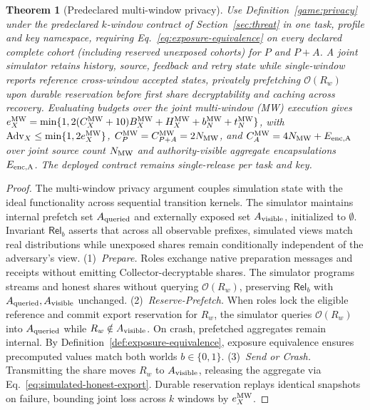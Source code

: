 \documentclass[conference,compsoc]{IEEEtran}
\theoremstyle{definition}
\numberwithin{equation}{section}
\numberwithin{table}{section}
\numberwithin{figure}{section}
\theoremstyle{plain}
\newtheorem{theorem}{Theorem}[section]
\newtheorem{theorem}{Theorem}
\begin{document}
\begin{theorem}[Predeclared multi-window privacy]
\label{thm:multi-window-privacy}
Use Definition~\ref{game:privacy} under the predeclared \(k\)-window contract of Section~\ref{sec:threat} in one task, profile and key namespace, requiring Eq.~\eqref{eq:exposure-equivalence} on every declared complete cohort (including reserved unexposed cohorts) for \(P\) and \(P{+}A\). A joint simulator retains history, source, feedback and retry state while single-window reports reference cross-window accepted states, privately prefetching \(\mathcal O(R_w)\) upon durable reservation before first share decryptability and caching across recovery. Evaluating budgets over the joint multi-window (MW) execution gives \(e_X^{\rm MW}=\min\{1,2(C_X^{\rm MW}+10)B_X^{\rm MW}+H_X^{\rm MW}+b_N^{\rm MW}+t_N^{\rm MW}\}\), with \(\operatorname{Adv}_X\le\min\{1,2e_X^{\rm MW}\}\), \(C_P^{\rm MW}=C_{P+A}^{\rm MW}=2N_{\rm MW}\), and \(C_A^{\rm MW}=4N_{\rm MW}+E_{\rm enc,A}\) over joint source count \(N_{\rm MW}\) and authority-visible aggregate encapsulations \(E_{\rm enc,A}\). The deployed contract remains single-release per task and key.
\end{theorem}
\begin{proof}
The multi-window privacy argument couples simulation state with the ideal functionality across sequential transition kernels. The simulator maintains internal prefetch set \(A_{\rm queried}\) and externally exposed set \(A_{\rm visible}\), initialized to \(\emptyset\). Invariant \(\mathsf{Rel}_b\) asserts that across all observable prefixes, simulated views match real distributions while unexposed shares remain conditionally independent of the adversary's view.
(1)~\emph{Prepare.} Roles exchange native preparation messages and receipts without emitting Collector-decryptable shares. The simulator programs streams and honest shares without querying \(\mathcal O(R_w)\), preserving \(\mathsf{Rel}_b\) with \(A_{\rm queried},A_{\rm visible}\) unchanged.
(2)~\emph{Reserve-Prefetch.} When roles lock the eligible reference and commit export reservation for \(R_w\), the simulator queries \(\mathcal O(R_w)\) into \(A_{\rm queried}\) while \(R_w\notin A_{\rm visible}\). On crash, prefetched aggregates remain internal. By Definition~\ref{def:exposure-equivalence}, exposure equivalence ensures precomputed values match both worlds \(b\in\{0,1\}\).
(3)~\emph{Send or Crash.} Transmitting the share moves \(R_w\) to \(A_{\rm visible}\), releasing the aggregate via Eq.~\eqref{eq:simulated-honest-export}. Durable reservation replays identical snapshots on failure, bounding joint loss across \(k\) windows by \(e_X^{\rm MW}\).
\end{proof}
\end{document}
